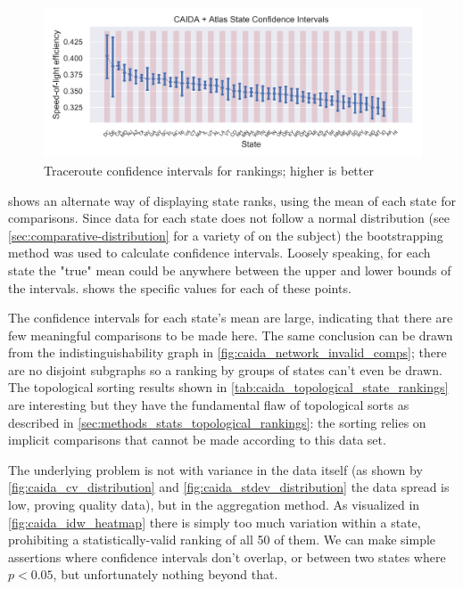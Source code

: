 \begin{figure}[htb]
    \centering
    \includegraphics[width=\textwidth]{images/comparative/confidence_intervals/caida_confidence_interval.png}
    \caption{Traceroute confidence intervals for rankings; higher is better}
    \label{fig:caida_confidence_intervals}
\end{figure}

 shows an alternate way of displaying state ranks, using the mean of each state for comparisons. Since data for each state does not follow a normal distribution (see \cref{sec:comparative-distribution} for a variety of \kdes on the subject) the bootstrapping method was used to calculate confidence intervals. Loosely speaking, for each state the "true" mean could be anywhere between the upper and lower bounds of the intervals.  shows the specific values for each of these points.



The confidence intervals for each state's mean are large, indicating that there are few meaningful comparisons to be made here. The same conclusion can be drawn from the indistinguishability graph in \cref{fig:caida_network_invalid_comps}; there are no disjoint subgraphs so a ranking by groups of states can't even be drawn. The topological sorting results shown in \cref{tab:caida_topological_state_rankings} are interesting but they have the fundamental flaw of topological sorts as described in \cref{sec:methods_stats_topological_rankings}: the sorting relies on implicit comparisons that cannot be made according to this data set.

The underlying problem is not with variance in the data itself (as shown by \cref{fig:caida_cv_distribution} and \cref{fig:caida_stdev_distribution} the data spread is low, proving quality data), but in the aggregation method. As visualized in \cref{fig:caida_idw_heatmap} there is simply too much variation within a state, prohibiting a statistically-valid ranking of all 50 of them. We can make simple assertions where confidence intervals don't overlap, or between two states where $p<0.05$, but unfortunately nothing beyond that.

